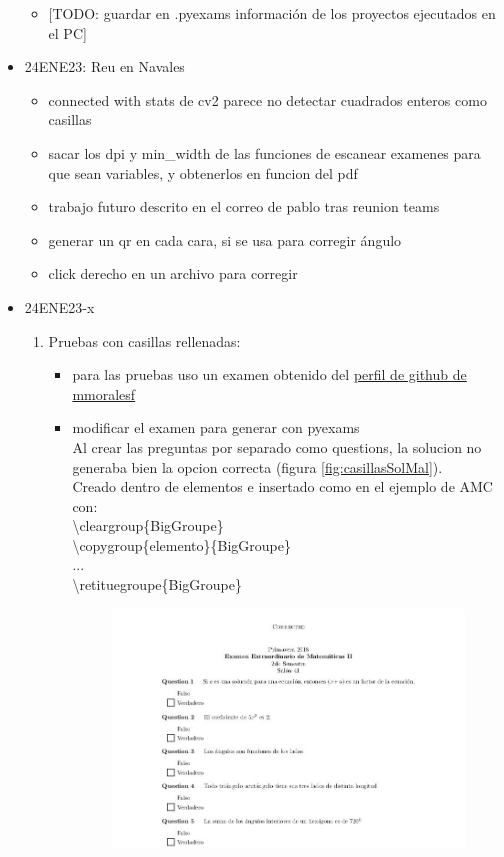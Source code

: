 \begin{itemize}
\begin{itemize}
        \item {[}TODO: guardar en .pyexams información de los proyectos ejecutados en el PC{]}
    \end{itemize}
    \item 24ENE23: Reu en Navales
    \begin{itemize}
        \item connected with stats de cv2 parece no detectar cuadrados enteros como casillas
        \item sacar los dpi y min\_width de las funciones de escanear examenes para que sean variables, y obtenerlos en funcion del pdf
        \item trabajo futuro descrito en el correo de pablo tras reunion teams 
        \item generar un qr en cada cara, si se usa para corregir ángulo
        \item click derecho en un archivo para corregir
    \end{itemize}
    \item 24ENE23-x
    \begin{enumerate}
        \item Pruebas con casillas rellenadas:
        \begin{itemize}
            \item para las pruebas uso un examen obtenido del \href{https://gist.github.com/mmoralesf}{perfil de github de mmoralesf}
            \item modificar el examen para generar con pyexams \\
            Al crear las preguntas por separado como questions, la solucion no generaba bien la opcion correcta (figura \ref{fig:casillasSolMal}). \\
            Creado dentro de elementos e insertado como en el ejemplo de AMC con: \\
            \textbackslash{}cleargroup\{BigGroupe\} \\
            \textbackslash{}copygroup\{elemento\}\{BigGroupe\} \\
            ... \\
            \textbackslash{}retituegroupe\{BigGroupe\}
            \begin{figure}
                \centering
                \includegraphics[width=\textwidth]{figures/casillas_sol_mal.jpeg}

\end{figure}
\end{itemize}
\end{enumerate}
\end{itemize}
